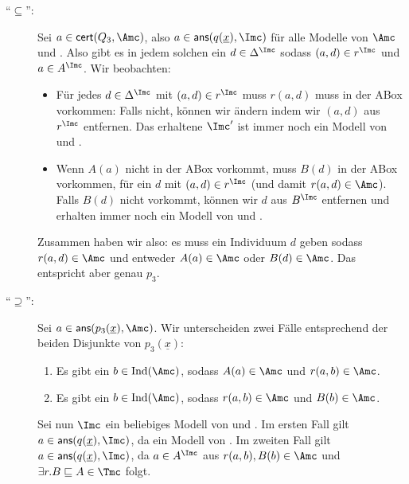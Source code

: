 \documentclass[fontsize=11pt, twoside=false, numbers=autoenddot]{scrbook}
\begin{document}
\begin{description}
  \item[{\boldmath "`$\subseteq$"':}]
    Sei $a\in\textsf{cert}(Q_3,\Amc)$, also
    $a\in\textsf{ans}(q(\underline x),\Imc)$ für alle Modelle \Imc von
    $\Amc$ und \Tmc. Also gibt es in jedem solchen \Imc ein
    $d\in\Delta^\Imc$ sodass $(a,d)\in r^\Imc$ und $a\in A^\Imc$. Wir
    beobachten:
    \begin{itemize}
    
      \item Für jedes $d\in\Delta^\Imc$ mit $(a,d)\in r^\Imc$ muss 
        $r(a,d)$ muss in der ABox vorkommen: Falls nicht, können wir
        \Imc ändern indem wir $(a,d)$ aus $r^\Imc$ entfernen. Das
        erhaltene $\Imc'$ ist immer noch ein Modell von \Amc und \Tmc.
    
      \item Wenn $A(a)$ nicht in der ABox vorkommt, muss $B(d)$ in der
        ABox vorkommen, für ein $d$ mit $(a,d)\in r^\Imc$ (und damit
        $r(a,d)\in \Amc$). Falls $B(d)$ nicht vorkommt, können wir
        $d$ aus $B^\Imc$ entfernen und erhalten immer noch ein Modell von
        \Amc und \Tmc.
    
    \end{itemize}
    Zusammen haben wir also: es muss ein Individuum $d$ geben sodass
    $r(a,d)\in \Amc$ und entweder $A(a)\in \Amc$ oder $B(d)\in \Amc$. Das
    entspricht aber genau $p_3$.
  \item[{\boldmath "`$\supseteq$"':}]
    Sei $a\in \textsf{ans}(p_3(\underline
    x),\Amc)$. Wir unterscheiden zwei Fälle entsprechend der beiden
    Disjunkte von $p_3(\underline x)$:
    \begin{enumerate}
    
      \item Es gibt ein $b\in\text{Ind}(\Amc)$, sodass $A(a)\in\Amc$ und
        $r(a,b)\in \Amc$.
    
      \item Es gibt ein $b\in\text{Ind}(\Amc)$, sodass 
        $r(a,b)\in \Amc$ und $B(b)\in \Amc$.
    
    \end{enumerate}
    Sei nun $\Imc$ ein beliebiges Modell von \Amc und \Tmc. Im ersten Fall
    gilt $a\in \textsf{ans}(q(\underline x),\Imc)$, da \Imc ein Modell von \Amc. Im
    zweiten Fall gilt $a\in \textsf{ans}(q(\underline x),\Imc)$, da
    $a\in A^\Imc$ aus $r(a,b),B(b)\in \Amc$ und $\exists r.B\sqsubseteq
    A\in\Tmc$ folgt. 
\end{description}
\end{document}
